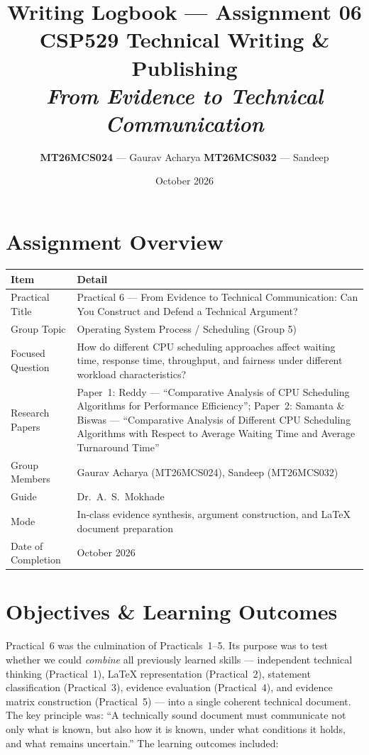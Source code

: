 \documentclass[11pt, a4paper]{article}
\title{
    \vspace{-1cm}
    \textbf{Writing Logbook --- Assignment 06} \\[0.3em]
    \large CSP529 Technical Writing \& Publishing \\[0.2em]
    \large \textit{From Evidence to Technical Communication}
}
\author{
    \textbf{MT26MCS024} --- Gaurav Acharya \quad
    \textbf{MT26MCS032} --- Sandeep
}
\date{October 2026}
\begin{document}
\maketitle
\thispagestyle{fancy}

\section{Assignment Overview}

\begin{tabular}{@{}p{4.5cm} p{10cm}@{}}
    \toprule
    \textbf{Item} & \textbf{Detail} \\
    \midrule
    Practical Title & Practical 6 --- From Evidence to Technical Communication: Can You Construct and Defend a Technical Argument? \\
    Group Topic & Operating System Process / Scheduling (Group 5) \\
    Focused Question & How do different CPU scheduling approaches affect waiting time, response time, throughput, and fairness under different workload characteristics? \\
    Research Papers & Paper~1: Reddy --- ``Comparative Analysis of CPU Scheduling Algorithms for Performance Efficiency''; Paper~2: Samanta \& Biswas --- ``Comparative Analysis of Different CPU Scheduling Algorithms with Respect to Average Waiting Time and Average Turnaround Time'' \\
    Group Members & Gaurav Acharya (MT26MCS024), Sandeep (MT26MCS032) \\
    Guide & Dr.\ A.\ S.\ Mokhade \\
    Mode & In-class evidence synthesis, argument construction, and LaTeX document preparation \\
    Date of Completion & October 2026 \\
    \bottomrule
\end{tabular}

\section{Objectives \& Learning Outcomes}

Practical~6 was the culmination of Practicals~1--5. Its purpose was to test whether we could \emph{combine} all previously learned skills --- independent technical thinking (Practical~1), LaTeX representation (Practical~2), statement classification (Practical~3), evidence evaluation (Practical~4), and evidence matrix construction (Practical~5) --- into a single coherent technical document. The key principle was: ``A technically sound document must communicate not only what is known, but also how it is known, under what conditions it holds, and what remains uncertain.'' The learning outcomes included:
\end{document}
